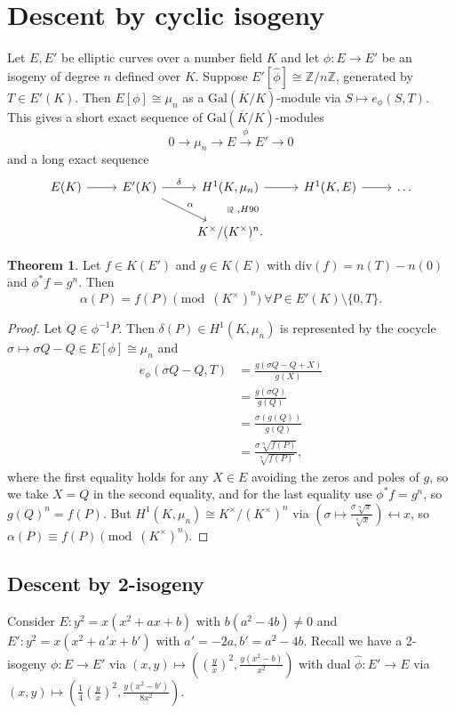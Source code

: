 \documentclass{article}
\theoremstyle{definition}
\newtheorem{theorem}{Theorem}[section]
\begin{document}
\section{Descent by cyclic isogeny}
Let $E,E'$ be elliptic curves over a number field $K$ and let $\phi: E \to E'$ be an isogeny of degree $n$ defined over $K$. Suppose $E'[\widehat{\phi}] \cong \mathbb{Z}/n\mathbb{Z}$, generated by $T \in E'(K)$. Then $E[\phi] \cong \mu_n$ as a $\text{Gal}(\overline{K}/K)$-module via $S \mapsto e_\phi(S,T)$. This gives a short exact sequence of $\text{Gal}(\overline{K}/K)$-modules
\[
0 \longrightarrow \mu_n \longrightarrow E \stackrel{\phi}{\longrightarrow} E' \longrightarrow 0
\]
and a long exact sequence
\[
\begin{tikzcd}
    E(K) \arrow{r}{} & E'(K) \arrow{r}{\delta}\arrow{rd}{\alpha} & H^1(K,\mu_n) \arrow{r}\arrow[draw=none]{d}[sloped,auto=false, rotate=0]{\cong}{~,H90} & H^1(K,E) \arrow{r} & \ldots \\
    & & K^\times/(K^\times)^n. &
\end{tikzcd}
\]
\begin{theorem}\label{theorem16.1}
    Let $f \in K(E')$ and $g \in K(E)$ with $\text{div}(f) = n(T) - n(0)$ and $\phi^* f = g^n$. Then $$\alpha(P) = f(P) \pmod{(K^\times)^n} ~\forall P \in E'(K)\setminus \{0,T\}.$$
\end{theorem}
\begin{proof}
    Let $Q \in \phi^{-1}P$. Then $\delta(P) \in H^1(K,\mu_n)$ is represented by the cocycle $\sigma \mapsto \sigma Q - Q \in E[\phi] \cong \mu_n$ and 
    \begin{align*}
        e_\phi(\sigma Q - Q, T) &= \frac{g(\sigma Q - Q + X)}{g(X)} \\
        &= \frac{g(\sigma Q)}{g(Q)} \\
        &= \frac{\sigma(g(Q))}{g(Q)} \\
        &= \frac{\sigma \sqrt[n]{f(P)}}{\sqrt[n]{f(P)}},
    \end{align*}
    where the first equality holds for any $X \in E$ avoiding the zeros and poles of $g$, so we take $X=Q$ in the second equality, and for the last equality use $\phi^* f = g^n$, so $g(Q)^n = f(P)$. But $H^1(K,\mu_n) \cong K^\times/(K^\times)^n$ via $\left(\sigma \mapsto \frac{\sigma \sqrt[n]{x}}{\sqrt[n]{x}}\right) \mapsfrom x$, so $\alpha(P) \equiv f(P) \pmod{(K^\times)^n}$.
\end{proof}
\subsection{Descent by 2-isogeny}
Consider $E: y^2=x(x^2+ax+b)$ with $b(a^2-4b) \neq 0$ and $E':y^2=x(x^2+a'x+b')$ with $a'=-2a, b'=a^2-4b$. Recall we have a 2-isogeny $\phi : E \to E'$ via $(x,y) \mapsto \left(\left(\frac{y}{x}\right)^2, \frac{y(x^2-b)}{x^2}\right)$ with dual $\widehat{\phi}: E' \to E$ via $(x,y) \mapsto \left(\frac{1}{4} \left(\frac{y}{x}\right)^2, \frac{y(x^2-b')}{8x^2}\right)$.
\end{document}

